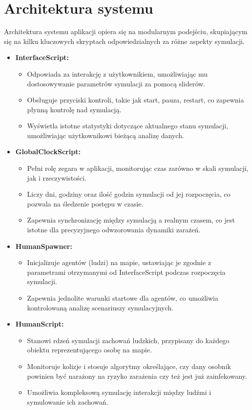 \section{\textbf{Architektura systemu}}

Architektura systemu aplikacji opiera się na modularnym podejściu, skupiającym się na kilku kluczowych skryptach odpowiedzialnych za różne aspekty symulacji.

\begin{itemize}
	\item \textbf{InterfaceScript:}
	\begin{itemize}
		\item Odpowiada za interakcję z użytkownikiem, umożliwiając mu dostosowywanie parametrów symulacji za pomocą sliderów.
		\item Obsługuje przyciski kontroli, takie jak start, pauza, restart, co zapewnia płynną kontrolę nad symulacją.
		\item Wyświetla istotne statystyki dotyczące aktualnego stanu symulacji, umożliwiając użytkownikowi bieżącą analizę danych.
	\end{itemize}
	
	\item \textbf{GlobalClockScript:}
	\begin{itemize}
		\item Pełni rolę zegara w aplikacji, monitorując czas zarówno w skali symulacji, jak i rzeczywistości.
		\item Liczy dni, godziny oraz ilość godzin symulacji od jej rozpoczęcia, co pozwala na śledzenie postępu w czasie.
		\item Zapewnia synchronizację między symulacją a realnym czasem, co jest istotne dla precyzyjnego odwzorowania dynamiki zarażeń.
	\end{itemize}
	
	\item \textbf{HumanSpawner:}
	\begin{itemize}
		\item Inicjalizuje agentów (ludzi) na mapie, ustawiając je zgodnie z parametrami otrzymanymi od InterfaceScript podczas rozpoczęcia symulacji.
		\item Zapewnia jednolite warunki startowe dla agentów, co umożliwia kontrolowaną analizę scenariuszy symulacyjnych.
	\end{itemize}
	
	\item \textbf{HumanScript:}
	\begin{itemize}
		\item Stanowi rdzeń symulacji zachowań ludzkich, przypisany do każdego obiektu reprezentującego osobę na mapie.
		\item Monitoruje kolizje i stosuje algorytmy określające, czy dany osobnik powinien być narażony na ryzyko zarażenia czy też jest już zainfekowany.
		\item Umożliwia kompleksową symulację interakcji między ludźmi i symulowanie ich zachowań.
	\end{itemize}
	

\end{itemize}
